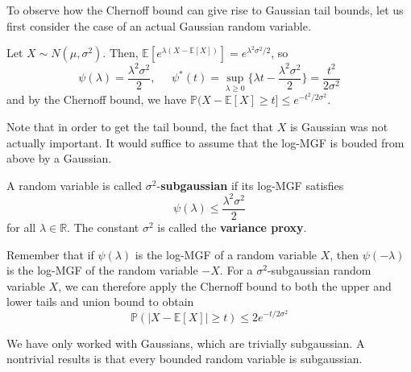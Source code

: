 \documentclass{article}
\begin{document}
To observe how the Chernoff bound can give rise to Gaussian tail bounds, let us first consider the case of an actual Gaussian random variable. 

\begin{example}
Let $X \sim N(\mu, \sigma^2)$. Then, $\mathbb{E}[ e^{\lambda (X - \mathbb{E}[X])} ] = e^{\lambda^2 \sigma^2 / 2}$, so 
\[\psi(\lambda) = \frac{\lambda^2 \sigma^2}{2}, \;\;\;\;\; \psi^* (t) = \sup_{\lambda \geq 0} \big\{ \lambda t - \frac{\lambda^2 \sigma^2}{2} \big\} = \frac{t^2}{2 \sigma^2}\]
and by the Chernoff bound, we have $\mathbb{P}(X - \mathbb{E}[X] \geq t ] \leq e^{-t^2 / 2\sigma^2}$. 
\end{example}

Note that in order to get the tail bound, the fact that $X$ is Gaussian was not actually important. It would suffice to assume that the log-MGF is bouded from above by a Gaussian. 

\begin{definition}
A random variable is called $\sigma^2$-\textbf{subgaussian} if its log-MGF satisfies 
\[\psi(\lambda) \leq \frac{\lambda^2 \sigma^2}{2}\]
for all $\lambda \in \mathbb{R}$. The constant $\sigma^2$ is called the \textbf{variance proxy}. 
\end{definition}

Remember that if $\psi(\lambda)$ is the log-MGF of a random variable $X$, then $\psi(-\lambda)$ is the log-MGF of the random variable $-X$. For a $\sigma^2$-subgaussian random variable $X$, we can therefore apply the Chernoff bound to both the upper and lower tails and union bound to obtain 
\[\mathbb{P}(|X - \mathbb{E}[X]| \geq t ) \leq 2 e^{-t/2\sigma^2}\]

We have only worked with Gaussians, which are trivially subgaussian. A nontrivial results is that every bounded random variable is subgaussian. 
\end{document}
